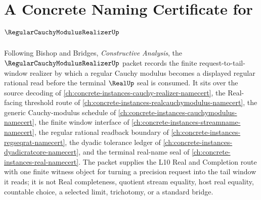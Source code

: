 \chapter{A Concrete Naming Certificate for $\RegularCauchyModulusRealizerUp$}
\label{ch:concrete-instances-regular-cauchy-modulus-realizer-namecert}

Following Bishop and Bridges, \emph{Constructive Analysis}, the $\RegularCauchyModulusRealizerUp$ packet records the finite request-to-tail-window realizer by which a regular Cauchy modulus becomes a displayed regular rational read before the terminal $\RealUp$ seal is consumed. It sits over the source decoding of \autoref{ch:concrete-instances-cauchy-realizer-namecert}, the Real-facing threshold route of \autoref{ch:concrete-instances-realcauchymodulus-namecert}, the generic Cauchy-modulus schedule of \autoref{ch:concrete-instances-cauchymodulus-namecert}, the finite window interface of \autoref{ch:concrete-instances-streamname-namecert}, the regular rational readback boundary of \autoref{ch:concrete-instances-regseqrat-namecert}, the dyadic tolerance ledger of \autoref{ch:concrete-instances-dyadicratcore-namecert}, and the terminal real-name seal of \autoref{ch:concrete-instances-real-namecert}. The packet supplies the L10 Real and Completion route with one finite witness object for turning a precision request into the tail window it reads; it is not Real completeness, quotient stream equality, host real equality, countable choice, a selected limit, trichotomy, or a standard bridge.

